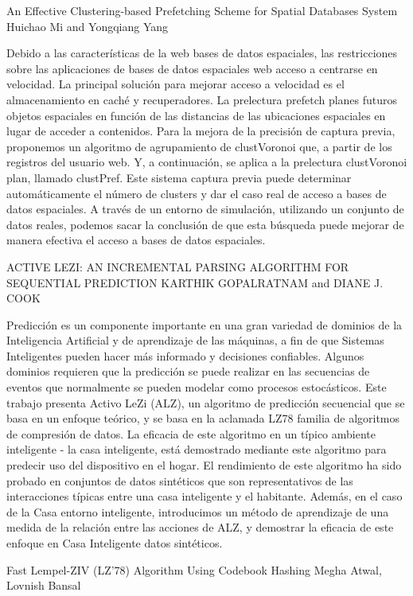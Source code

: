 An Effective Clustering-based Prefetching Scheme
for Spatial Databases System
Huichao Mi and Yongqiang Yang

Debido a las características de la web bases de datos espaciales, las restricciones sobre las aplicaciones de bases de datos espaciales web acceso a centrarse en velocidad. La principal solución para mejorar acceso a velocidad es el almacenamiento en caché y recuperadores. La prelectura prefetch planes futuros objetos espaciales en función de las distancias de las ubicaciones espaciales en lugar de acceder a contenidos. Para la mejora de la precisión de captura previa, proponemos un algoritmo de agrupamiento de clustVoronoi que, a partir de los registros del usuario web. Y, a continuación, se aplica a la prelectura clustVoronoi plan, llamado clustPref. Este sistema captura previa puede determinar automáticamente el número de clusters y dar el caso real de acceso a bases de datos espaciales. A través de un entorno de simulación, utilizando un conjunto de datos reales, podemos sacar la conclusión de que esta búsqueda puede mejorar de manera efectiva el acceso a bases de datos espaciales.


ACTIVE LEZI: AN INCREMENTAL PARSING ALGORITHM FOR SEQUENTIAL PREDICTION
KARTHIK GOPALRATNAM and DIANE J. COOK

Predicción es un componente importante en una gran variedad de dominios de la Inteligencia Artificial y de aprendizaje de las máquinas, a fin de que Sistemas Inteligentes pueden hacer más informado y decisiones confiables. Algunos dominios requieren que la predicción se puede realizar en las secuencias de eventos que normalmente se pueden modelar como procesos estocásticos. Este trabajo presenta Activo LeZi (ALZ), un algoritmo de predicción secuencial que se basa en un enfoque teórico, y se basa en la aclamada LZ78 familia de algoritmos de compresión de datos. La eficacia de este algoritmo en un típico ambiente inteligente - la casa inteligente, está demostrado mediante este algoritmo para predecir uso del dispositivo en el hogar. El rendimiento de este algoritmo ha sido probado en conjuntos de datos sintéticos que son representativos de las interacciones típicas entre una casa inteligente y el habitante. Además, en el caso de la Casa entorno inteligente, introducimos un método de aprendizaje de una medida de la relación entre las acciones de ALZ, y demostrar la eficacia de este enfoque en Casa Inteligente datos sintéticos.


Fast Lempel-ZIV (LZ’78) Algorithm Using Codebook Hashing
Megha Atwal, Lovnish Bansal

